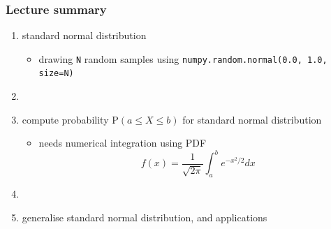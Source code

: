 \documentclass[english,14pt]{beamer}
\begin{document}
\begin{frame}[fragile]

\frametitle{Lecture summary}

\begin{enumerate}
	\item standard normal distribution
	\begin{itemize}
		\item drawing \texttt{N} random samples using \texttt{numpy.random.normal(0.0, 1.0, size=N)}
	\end{itemize}
	
	\item[]
	
	\item compute probability $\mathrm{P}(a \leq X \leq b)$ for standard normal distribution
	\begin{itemize}
		\item needs numerical integration using PDF
		\[
			f(x) = \frac{1}{\sqrt{2\pi}} \int_a^b e^{-x^2/2} dx
		\]
	\end{itemize}
	
	\item[]
	
	\item generalise standard normal distribution, and applications
	
\end{enumerate}

\end{frame}
\end{document}

